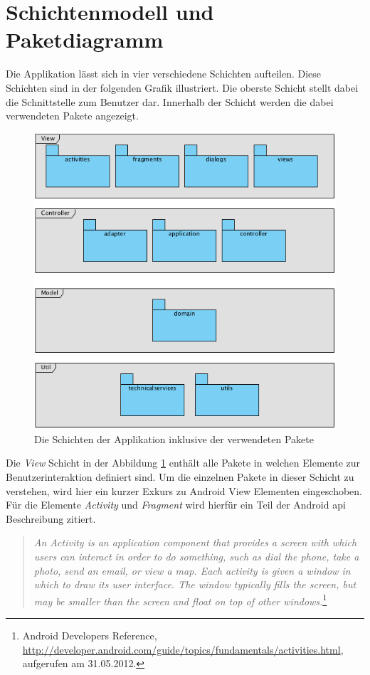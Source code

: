 \section{Schichtenmodell und Paketdiagramm}
Die Applikation lässt sich in vier verschiedene Schichten aufteilen. Diese Schichten sind in der folgenden Grafik illustriert. Die oberste Schicht stellt dabei die Schnittstelle zum Benutzer dar. Innerhalb der Schicht werden die dabei verwendeten Pakete angezeigt.  
\begin{figure}[h!]
\caption{Die Schichten der Applikation inklusive der verwendeten Pakete}
\label{fig:layer}
\centering
\includegraphics[scale=0.9]{05bericht/images/packagediagram.png}
\end{figure} 

Die \textit{View} Schicht in der Abbildung \ref{fig:layer} enthält alle Pakete in welchen Elemente zur Benutzerinteraktion definiert sind. Um die einzelnen Pakete in dieser Schicht zu verstehen, wird hier ein kurzer Exkurs zu Android View Elementen eingeschoben. Für die Elemente \textit{Activity} und \textit{Fragment} wird hierfür ein Teil der Android \gls{api} Beschreibung zitiert.

\begin{quote}
\textit{An Activity is an application component that provides a screen with which users can interact in order to do something, such as dial the phone, take a photo, send an email, or view a map. Each activity is given a window in which to draw its user interface. The window typically fills the screen, but may be smaller than the screen and float on top of other windows.}\footnote{Android Developers Reference, \url{http://developer.android.com/guide/topics/fundamentals/activities.html}, aufgerufen am 31.05.2012.}
\end{quote}

